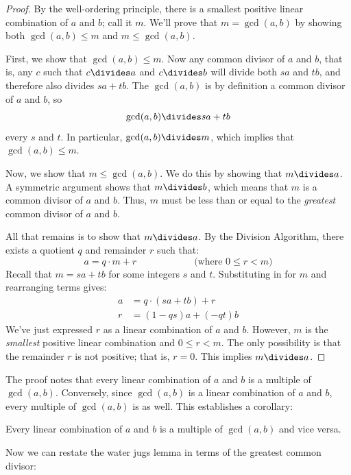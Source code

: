 \begin{proof}
By the well-ordering principle, there is a smallest positive linear
combination of $a$ and $b$; call it $m$.  We'll prove that $m = \gcd(a,
b)$ by showing both $\gcd(a, b) \leq m$ and $m \leq \gcd(a, b)$.

First, we show that $\gcd(a, b) \leq m$.  Now any common divisor of $a$
and $b$, that is, any $c$ such that $c \divides a$ and $c \divides b$ will
divide both $sa$ and $tb$, and therefore also divides $sa+tb$.   The
$\gcd(a, b)$ is by definition a common divisor of $a$ and $b$, so
%
\[
\gcd(a, b) \divides s a + t b
\]
every $s$ and $t$.
%
In particular, $\gcd(a, b) \divides m$, which implies that $\gcd(a, b)
\leq m$.

Now, we show that $m \leq \gcd(a, b)$.  We do this by showing that $m
\divides a$.  A symmetric argument shows that $m \divides b$, which means
that $m$ is a common divisor of $a$ and $b$.  Thus, $m$ must be less than
or equal to the \textit{greatest} common divisor of $a$ and $b$.

All that remains is to show that $m \divides a$.  By the Division
Algorithm, there exists a quotient $q$ and remainder $r$ such that:
%
\[
a = q \cdot m + r \hspace{1in} \text{(where $0 \leq r < m$)}
\]
%
Recall that $m = s a + t b$ for some integers $s$ and $t$.
Substituting in for $m$ and rearranging terms gives:
%
\begin{align*}
a & = q \cdot (s a + t b) + r \\
r & = (1 - qs) a + (-qt) b
\end{align*}
%
We've just expressed $r$ as a linear combination of $a$ and $b$.
However, $m$ is the \textit{smallest} positive linear combination and
$0 \leq r < m$.  The only possibility is that the remainder $r$ is not
positive; that is, $r = 0$.  This implies $m \divides a$.
\end{proof}

The proof notes that every linear combination of $a$ and $b$ is a
multiple of $\gcd(a, b)$.  Conversely, since $\gcd(a, b)$ is a linear
combination of $a$ and $b$, every multiple of $\gcd(a, b)$ is as well.
This establishes a corollary:

\begin{corollary}
\label{cor:lin-comb}
Every linear combination of $a$ and $b$ is a multiple of $\gcd(a, b)$
and vice versa.
\end{corollary}

Now we can restate the water jugs lemma in terms of the greatest
common divisor:

